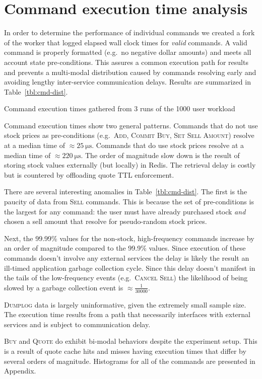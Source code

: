 \section{Command execution time analysis}\label{sec:cmd-dist}
In order to determine the performance of individual commands we created a fork of the worker that logged elapsed wall clock times for \textit{valid} commands.
A valid command is properly formatted (e.g.\ no negative dollar amounts) and meets all account state pre-conditions.
This assures a common execution path for results and prevents a multi-modal distribution caused by commands resolving early and avoiding lengthy inter-service communication delays.
Results are summarized in Table~\ref{tbl:cmd-dist}.

\begin{table}[htpb]
  \centering
  \caption[Command execution time percentiles]{Command execution times gathered from 3 runs of the 1000 user workload}
  \label{tbl:cmd-dist}
  
\end{table}

Command execution times show two general patterns.
Commands that do not use stock prices as pre-conditions (e.g.\ \textsc{Add}, \textsc{Commit Buy}, \textsc{Set Sell Amount}) resolve at a median time of $\approx \SI{25}{\micro\second}$.
Commands that do use stock prices resolve at a median time of $\approx \SI{220}{\micro\second}$.
The order of magnitude slow down is the result of storing stock values externally (but locally) in Redis.
The retrieval delay is costly but is countered by offloading quote TTL enforcement.

There are several interesting anomalies in Table~\ref{tbl:cmd-dist}.
The first is the paucity of data from \textsc{Sell} commands.
This is because the set of pre-conditions is the largest for any command: the user must have already purchased stock \textit{and} chosen a sell amount that resolve for pseudo-random stock prices. 

Next, the 99.99\% values for the non-stock, high-frequency commands increase by an order of magnitude compared to the 99.9\% values.
Since execution of these commands doesn't involve any external services the delay is likely the result an ill-timed application garbage collection cycle.
Since this delay doesn't manifest in the tails of the low-frequency events (e.g.\ \textsc{Cancel Sell}) the likelihood of being slowed by a garbage collection event is $\approx \frac{1}{30000}$.

\textsc{Dumplog} data is largely uninformative, given the extremely small sample size.
The execution time results from a path that necessarily interfaces with external services and is subject to communication delay.

\textsc{Buy} and \textsc{Quote} do exhibit bi-modal behaviors despite the experiment setup.
This is a result of quote cache hits and misses having execution times that differ by several orders of magnitude.
Histograms for all of the commands are presented in Appendix.
